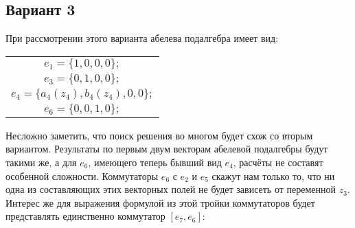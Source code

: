 \documentclass{article}
\begin{document}


\newpage
\subsection*{Вариант 3}

При рассмотрении этого варианта абелева подалгебра имеет вид:
\begin{flushleft}
\begin{tabular}{c}
$e_{1}=\{1,0,0,0\};$ \\
$e_{3}=\{0,1,0,0\};$ \\
$e_{4}=\{a_{4}(z_{4}), b_{4}(z_{4}), 0 ,0\};$  \\
$e_{6}=\{0,0,1,0\};$ \\
\end{tabular}
\end{flushleft}

Несложно заметить, что поиск решения во многом будет схож со вторым вариантом. Результаты по первым двум векторам абелевой подалгебры будут такими же, а для $e_{6}$, имеющего теперь бывший вид $e_{4}$, расчёты не составят особенной сложности. Коммутаторы $e_{6}$ с $e_{2}$ и $e_{5}$ скажут нам только то, что ни одна из составляющих этих векторных полей не будет зависеть от переменной $z_{3}$. Интерес же для выражения формулой из этой тройки коммутаторов будет представлять единственно коммутатор $[e_{7}, e_{6}]$:
\end{document}
